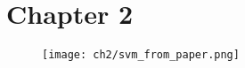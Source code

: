 \chapter{Chapter 2}
\label{chapter2}


\begin{figure}
\texttt{[image: ch2/svm\_from\_paper.png]}
\end{figure}

